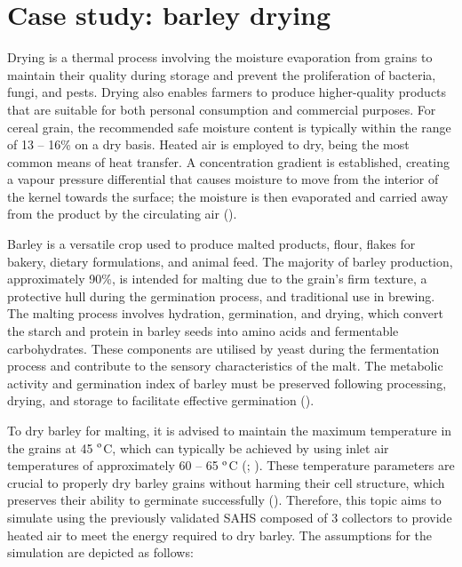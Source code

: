 \newpage
\section{Case study: barley drying}

Drying is a thermal process involving the moisture evaporation from grains to maintain their quality during storage and prevent the proliferation of bacteria, fungi, and pests. Drying also enables farmers to produce higher-quality products that are suitable for both personal consumption and commercial purposes. For cereal grain, the recommended safe moisture content is typically within the range of 13 -- 16\% on a dry basis. Heated air is employed to dry, being the most common means of heat transfer. A concentration gradient is established, creating a vapour pressure differential that causes moisture to move from the interior of the kernel towards the surface; the moisture is then evaporated and carried away from the product by the circulating air (\cite{Bala2017}).

Barley is a versatile crop used to produce malted products, flour, flakes for bakery, dietary formulations, and animal feed. The majority of barley production, approximately 90\%, is intended for malting due to the grain's firm texture, a protective hull during the germination process, and traditional use in brewing. The malting process involves hydration, germination, and drying, which convert the starch and protein in barley seeds into amino acids and fermentable carbohydrates. These components are utilised by yeast during the fermentation process and contribute to the sensory characteristics of the malt. The metabolic activity and germination index of barley must be preserved following processing, drying, and storage to facilitate effective germination (\cite{Soares2016}).

To dry barley for malting, it is advised to maintain the maximum temperature in the grains at 45 $^{\rm{o}}$C, which can typically be achieved by using inlet air temperatures of approximately 60 -- 65 $^{\rm{o}}$C (\cite{Embrapa2021}; \cite{Syngenta2020}). These temperature parameters are crucial to properly dry barley grains without harming their cell structure, which preserves their ability to germinate successfully (\cite{Soares2016}). Therefore, this topic aims to simulate using the previously validated SAHS composed of 3 collectors to provide heated air to meet the energy required to dry barley. The assumptions for the simulation are depicted as follows:

